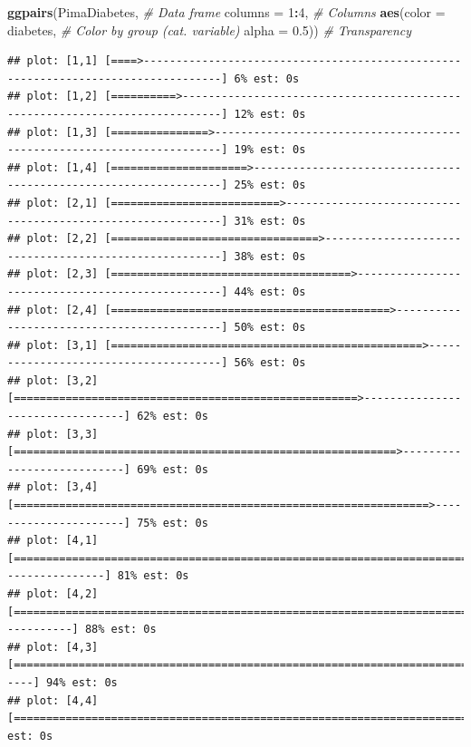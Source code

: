 \documentclass[
]{book}
\newenvironment{Shaded}{\begin{snugshade}}{\end{snugshade}}
\newcommand{\AttributeTok}[1]{\textcolor[rgb]{0.13,0.29,0.53}{#1}}
\newcommand{\CommentTok}[1]{\textcolor[rgb]{0.56,0.35,0.01}{\textit{#1}}}
\newcommand{\DecValTok}[1]{\textcolor[rgb]{0.00,0.00,0.81}{#1}}
\newcommand{\FloatTok}[1]{\textcolor[rgb]{0.00,0.00,0.81}{#1}}
\newcommand{\FunctionTok}[1]{\textcolor[rgb]{0.13,0.29,0.53}{\textbf{#1}}}
\newcommand{\NormalTok}[1]{#1}
\newcommand{\SpecialCharTok}[1]{\textcolor[rgb]{0.81,0.36,0.00}{\textbf{#1}}}
\begin{document}
\begin{Shaded}
\begin{Highlighting}[]
\FunctionTok{ggpairs}\NormalTok{(PimaDiabetes,                  }\CommentTok{\# Data frame}
        \AttributeTok{columns =} \DecValTok{1}\SpecialCharTok{:}\DecValTok{4}\NormalTok{,         }\CommentTok{\# Columns}
        \FunctionTok{aes}\NormalTok{(}\AttributeTok{color =}\NormalTok{ diabetes,  }\CommentTok{\# Color by group (cat. variable)}
            \AttributeTok{alpha =} \FloatTok{0.5}\NormalTok{))      }\CommentTok{\# Transparency}
\end{Highlighting}
\end{Shaded}

\begin{verbatim}
## plot: [1,1] [====>----------------------------------------------------------------------------------] 6% est: 0s
## plot: [1,2] [==========>----------------------------------------------------------------------------] 12% est: 0s
## plot: [1,3] [===============>-----------------------------------------------------------------------] 19% est: 0s
## plot: [1,4] [=====================>-----------------------------------------------------------------] 25% est: 0s
## plot: [2,1] [==========================>------------------------------------------------------------] 31% est: 0s
## plot: [2,2] [================================>------------------------------------------------------] 38% est: 0s
## plot: [2,3] [=====================================>-------------------------------------------------] 44% est: 0s
## plot: [2,4] [===========================================>-------------------------------------------] 50% est: 0s
## plot: [3,1] [================================================>--------------------------------------] 56% est: 0s
## plot: [3,2] [=====================================================>---------------------------------] 62% est: 0s
## plot: [3,3] [===========================================================>---------------------------] 69% est: 0s
## plot: [3,4] [================================================================>----------------------] 75% est: 0s
## plot: [4,1] [======================================================================>----------------] 81% est: 0s
## plot: [4,2] [===========================================================================>-----------] 88% est: 0s
## plot: [4,3] [=================================================================================>-----] 94% est: 0s
## plot: [4,4] [=======================================================================================]100% est: 0s
\end{verbatim}
\end{document}
